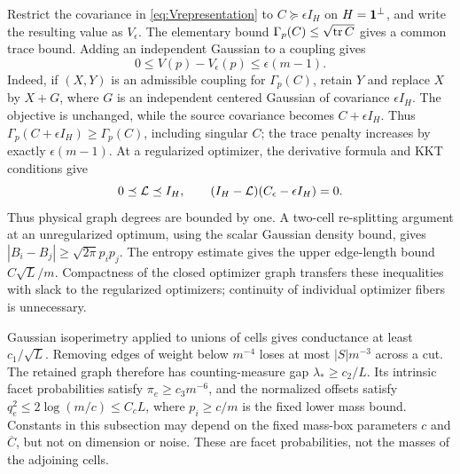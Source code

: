 Restrict the covariance in \eqref{eq:Vrepresentation} to
$C\succeq\epsilon I_H$ on $H=\mathbf 1^\perp$, and write the resulting value
as $V_\epsilon$. The elementary bound
$\Gamma_p(C)\le\sqrt{\operatorname{tr} C}$ gives a common trace bound. Adding an
independent Gaussian to a coupling gives
\begin{equation}\label{eq:Vepsilon}
 0\le V(p)-V_\epsilon(p)\le\epsilon(m-1).
\end{equation}
Indeed, if $(X,Y)$ is an admissible coupling for $\Gamma_p(C)$, retain
$Y$ and replace $X$ by $X+G$, where $G$ is an independent centered
Gaussian of covariance $\epsilon I_H$. The objective is unchanged, while
the source covariance becomes $C+\epsilon I_H$. Thus
$\Gamma_p(C+\epsilon I_H)\ge\Gamma_p(C)$, including singular $C$;
the trace penalty increases by exactly $\epsilon(m-1)$.
At a regularized optimizer, the derivative formula and KKT conditions give
\[
 0\preceq\mathcal L\preceq I_H,\qquad
       (I_H-\mathcal L)(C_\epsilon-\epsilon I_H)=0.
\]
Thus physical graph degrees are bounded by one. A two-cell re-splitting
argument at an unregularized optimum, using the scalar Gaussian density
bound, gives $|B_i-B_j|\ge\sqrt{2\pi}p_ip_j$. The entropy estimate gives
the upper edge-length bound $C\sqrt L/m$. Compactness of the closed
optimizer graph transfers these inequalities with slack to the regularized
optimizers; continuity of individual optimizer fibers is unnecessary.

Gaussian isoperimetry applied to unions of cells gives conductance at least
$c_1/\sqrt L$. Removing edges of weight below $m^{-4}$ loses at most
$|S|m^{-3}$ across a cut. The retained graph therefore has counting-measure
gap $\lambda_*\ge c_2/L$. Its intrinsic facet probabilities satisfy
$\pi_e\ge c_3m^{-6}$, and the normalized offsets satisfy
$q_e^2\le 2\log(m/c)\le C_c L$, where $p_i\ge c/m$ is the fixed
lower mass bound. Constants in this subsection may depend on the fixed
mass-box parameters $c$ and $\overline C$, but not on dimension or noise.
These are facet probabilities, not the masses of the adjoining cells.

